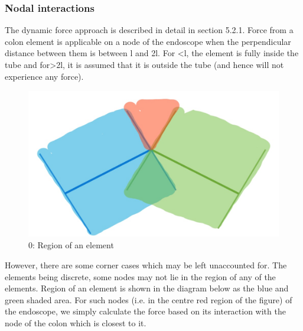 \documentclass[12pt]{report}
\begin{document}

\begin{Center}

\end{Center}\par

\subsubsection*{Nodal interactions}
The dynamic force approach is described in detail in section 5.2.1. Force from a colon element is applicable on a node of the endoscope when the perpendicular distance between them is between l and 2l. For <l, the element is fully inside the tube and for>2l, it is assumed that it is outside the tube (and hence will not experience any force). \par




\begin{figure}[H]
	\begin{Center}
		\includegraphics[width=4.46in,height=2.58in]{./media/image11.jpeg}
		\caption{0: Region of an element }
		\label{fig:0_Region_of_an_element_}
	\end{Center}
\end{figure}



\par

\par

However, there are some corner cases which may be left unaccounted for. The elements being discrete, some nodes may not lie in the region of any of the elements. Region of an element is shown in the diagram below as the blue and green shaded area. For such nodes (i.e. in the centre red region of the figure) of the endoscope, we simply calculate the force based on its interaction with the node of the colon which is closest to it.\par
\end{document}
